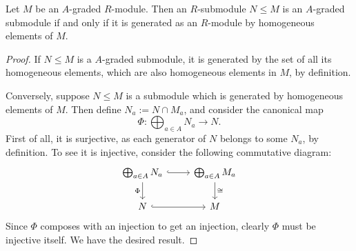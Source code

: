 \documentclass[../main.tex]{subfiles}
\begin{document}
\begin{lemma}\label{submodule_lemma}
	Let $M$ be an $A$-graded $R$-module. Then an $R$-submodule $N\leq M$ is an $A$-graded submodule if and only if it is generated as an $R$-module by homogeneous elements of $M$.
\end{lemma}
\begin{proof}
	If $N\leq M$ is a $A$-graded submodule, it is generated by the set of all its homogeneous elements, which are also homogeneous elements in $M$, by definition.

	Conversely, suppose $N\leq M$ is a submodule which is generated by homogeneous elements of $M$. Then define $N_a:=N\cap M_a$, and consider the canonical map
	\[\Phi:\bigoplus_{a\in A}N_a\to N.\]
	First of all, it is surjective, as each generator of $N$ belongs to some $N_a$, by definition. To see it is injective, consider the following commutative diagram:
	\[\begin{tikzcd}
		{\bigoplus_{a\in A}N_a} & {\bigoplus_{a\in A}M_a} \\
		N & M
		\arrow[hook, from=1-1, to=1-2]
		\arrow["\cong", from=1-2, to=2-2]
		\arrow["\Phi"', from=1-1, to=2-1]
		\arrow[hook, from=2-1, to=2-2]
	\end{tikzcd}\]
	Since $\Phi$ composes with an injection to get an injection, clearly $\Phi$ must be injective itself. We have the desired result.
\end{proof}
\end{document}
